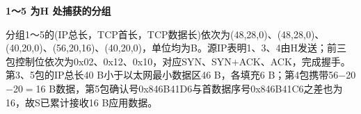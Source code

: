 {\color{ink}\bfseries 1～5 为H 处捕获的分组}\par\vspace{1bp}分组1～5的(IP总长，TCP首长，TCP数据长)依次为(48,\allowbreak{}28,\allowbreak{}0)、(48,\allowbreak{}28,\allowbreak{}0)、(40,\allowbreak{}20,\allowbreak{}0)、(56,\allowbreak{}20,\allowbreak{}16)、(40,\allowbreak{}20,\allowbreak{}0)，单位均为B。源IP表明1、3、4由H发送；前三包控制位依次为0x02、0x12、0x10，对应SYN、SYN\(+\allowbreak{}\)ACK、ACK，完成握手。第3、5包的IP总长40 B小于以太网最小数据区46 B，各填充6 B；第4包携带56\(-\)20\(-\)20\(=\allowbreak{}\)16 B数据，第5包确认号0x846B41D6与首数据序号0x846B41C6之差也为16，故S已累计接收16 B应用数据。
